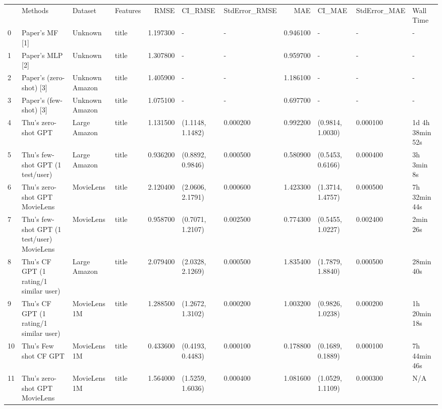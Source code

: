 \begin{tabular}{llllrllrlll}
 & Methods & Dataset & Features & RMSE & CI_RMSE & StdError_RMSE & MAE & CI_MAE & StdError_MAE & Wall Time \\
0 & Paper's MF [1] & Unknown & title & 1.197300 & - & - & 0.946100 & - & - & - \\
1 & Paper's MLP [2] & Unknown & title & 1.307800 & - & - & 0.959700 & - & - & - \\
2 & Paper's (zero-shot) [3] & Unknown Amazon & title & 1.405900 & - & - & 1.186100 & - & - & - \\
3 & Paper's (few-shot) [3] & Unknown Amazon & title & 1.075100 & - & - & 0.697700 & - & - & - \\
4 & Thu's zero-shot GPT & Large Amazon & title & 1.131500 & (1.1148, 1.1482) & 0.000200 & 0.992200 & (0.9814, 1.0030) & 0.000100 & 1d 4h 38min 52s \\
5 & Thu's few-shot GPT (1 test/user) & Large Amazon & title & 0.936200 & (0.8892, 0.9846) & 0.000500 & 0.580900 & (0.5453, 0.6166) & 0.000400 & 3h 3min 8s \\
6 & Thu's zero-shot GPT MovieLens & MovieLens & title & 2.120400 & (2.0606, 2.1791) & 0.000600 & 1.423300 & (1.3714, 1.4757) & 0.000500 & 7h 32min 44s \\
7 & Thu's few-shot GPT (1 test/user) MovieLens & MovieLens & title & 0.958700 & (0.7071, 1.2107) & 0.002500 & 0.774300 & (0.5455, 1.0227) & 0.002400 & 2min 26s \\
8 & Thu's CF GPT (1 rating/1 similar user) & Large Amazon & title & 2.079400 & (2.0328, 2.1269) & 0.000500 & 1.835400 & (1.7879, 1.8840) & 0.000500 & 28min 40s \\
9 & Thu's CF GPT (1 rating/1 similar user) & MovieLens 1M & title & 1.288500 & (1.2672, 1.3102) & 0.000200 & 1.003200 & (0.9826, 1.0238) & 0.000200 & 1h 20min 18s \\
10 & Thu's Few shot CF GPT & MovieLens 1M & title & 0.433600 & (0.4193, 0.4483) & 0.000100 & 0.178800 & (0.1689, 0.1889) & 0.000100 & 7h 44min 46s \\
11 & Thu's zero-shot GPT MovieLens & MovieLens 1M & title & 1.564000 & (1.5259, 1.6036) & 0.000400 & 1.081600 & (1.0529, 1.1109) & 0.000300 & N/A \\
\end{tabular}
